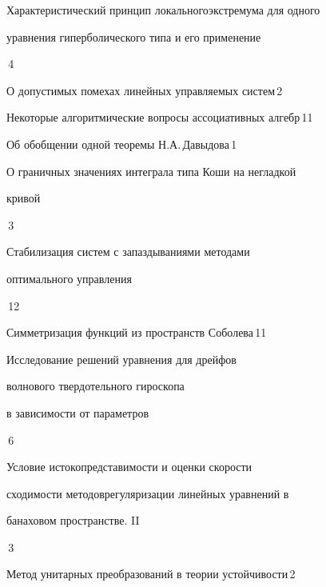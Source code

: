

{Характеристический принцип локального\newline экстремума для одного 


уравнения гиперболического типа и его применение}{\No\,4}




{О допустимых помехах линейных управляемых систем}{\No\,2}




{Некоторые алгоритмические вопросы ассоциативных алгебр}{\No\,11}




{Об обобщении одной теоремы Н.А.\,Давыдова}{\No\,1}




{О граничных значениях интеграла типа Коши на негладкой\newline


кривой}{\No\,3}




{Стабилизация систем с запаздываниями методами\newline


оптимального управления}{\No\,12}






{Симметризация функций из пространств Соболева}{\No\,11}




{Исследование решений уравнения для дрейфов\newline


волнового твердотельного гироскопа


в зависимости от параметров}{\No\,6}




{Условие истокопредставимости и оценки скорости 


сходимости методов\newline регуляризации линейных уравнений в 


банаховом пространстве. II}{\No\,3}




{Метод унитарных преобразований в теории устойчивости}{\No\,2}


